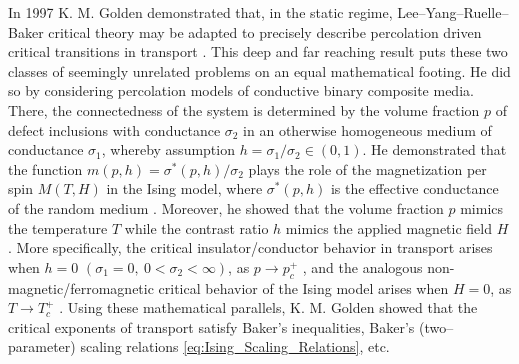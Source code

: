 \documentclass[english,12pt,jmp,graphicx]{revtex4-1}
\begin{document}
In 1997 K. M. Golden demonstrated that, in the static regime,
Lee--Yang--Ruelle--Baker critical theory may be adapted to
precisely describe percolation driven critical transitions in transport  
\cite{Golden:PRL-3935}. This deep and far reaching result puts these
two classes of seemingly unrelated problems on an equal mathematical
footing. He did so by considering percolation models of  
conductive binary composite media. There, the connectedness of the
system is determined by the volume fraction $p$ of defect inclusions
with conductance $\sigma_2$ in an otherwise homogeneous medium of
conductance $\sigma_1$, whereby assumption $h=\sigma_1/\sigma_2\in(0,1)$. He
demonstrated that the function $m(p,h)=\sigma^*(p,h)/\sigma_2$ plays the role of
the magnetization per spin $M(T,H)$ in the Ising model, where
$\sigma^*(p,h)$ is the effective conductance of the random medium
\cite{Bergman:PRC-377,Milton:APL-300,Golden:CMP-473}. Moreover, he
showed that 
the volume fraction $p$ mimics the temperature $T$ while the contrast
ratio $h$ mimics the applied magnetic field $H$. More specifically,
the critical insulator/conductor behavior in transport arises when
$h=0$ $(\sigma_1=0, \ 0<\sigma_2<\infty)$, as $p\to p_c^+$ \cite{Golden:PRL-3935}, and
the analogous non-magnetic/ferromagnetic critical behavior of the
Ising model arises when $H=0$, as $T\to T_c^+$
\cite{Christensen-2005}. Using these mathematical parallels,
K. M. Golden showed that the critical exponents of transport satisfy
Baker's inequalities, Baker's (two--parameter) scaling relations
\eqref{eq:Ising_Scaling_Relations}, etc.  
\end{document}
